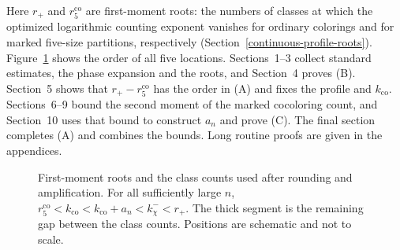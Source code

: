 \documentclass[a4paper,10pt,reqno]{amsart}
\numberwithin{equation}{section}
\theoremstyle{plain}
\theoremstyle{remark}
\begin{document}
Here $r_+$ and $r_5^{\mathrm{co}}$ are first-moment roots: the numbers of
classes at which the optimized logarithmic counting exponent vanishes for
ordinary colorings and for marked five-size partitions, respectively
(Section~\ref{continuous-profile-roots}). Figure~\ref{fig:final-root-geometry}
shows the order of all five locations. Sections~1--3 collect standard
estimates, the phase expansion and the roots, and Section~4 proves (B).
Section~5 shows that $r_+-r_5^{\mathrm{co}}$ has the order in (A) and fixes
the profile and $k_{\mathrm{co}}$. Sections~6--9 bound the second moment of
the marked cocoloring count, and Section~10 uses that bound to construct
\(a_n\) and prove (C). The final section completes (A) and combines the
bounds. Long routine proofs are given in the appendices.

\begin{figure}[htbp]
\centering
{}
\caption{First-moment roots and the class counts used after rounding and
amplification. For all sufficiently large $n$,
$r_5^{\mathrm{co}}<k_{\mathrm{co}}<k_{\mathrm{co}}+a_n<k_\chi^-<r_+$.
The thick segment is the remaining gap between the class counts.
Positions are schematic and not to scale.}
\label{fig:final-root-geometry}
\end{figure}
\end{document}
